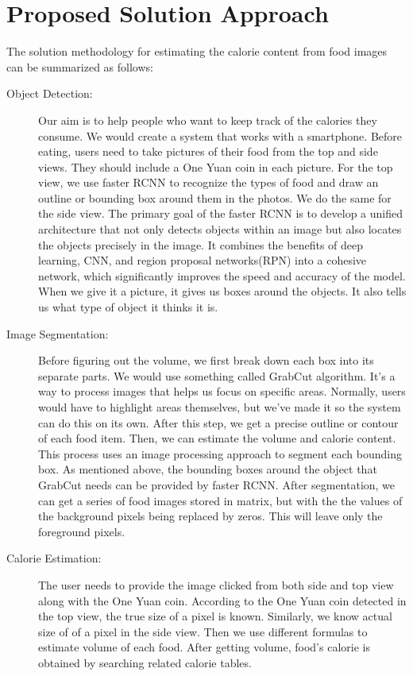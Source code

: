 \documentclass[12pt, a4paper, twoside]{article}
\begin{document}
\section{Proposed Solution Approach}
The solution methodology for estimating the calorie content from food images can be summarized as follows:
\begin{description}
	\item[Object Detection:] Our aim is to help people who want to keep track of the calories they consume. We would create a system that works with a smartphone. Before eating, users need to take pictures of their food from the top and side views. They should include a One Yuan coin in each picture. For the top view, we use faster RCNN to recognize the types of food and draw an outline or bounding box around them in the photos. We do the same for the side view. The primary goal of the faster RCNN is to develop a unified architecture that not only detects objects within an image but also locates the objects precisely in the image. It combines the benefits of deep learning, CNN, and region proposal networks(RPN) into a cohesive network, which significantly improves the speed and accuracy of the model. When we give it a picture, it gives us boxes around the objects. It also tells us what type of object it thinks it is.
	
	\item[Image Segmentation:] Before figuring out the volume, we first break down each box into its separate parts. We would use something called GrabCut algorithm. It's a way to process images that helps us focus on specific areas. Normally, users would have to highlight areas themselves, but we've made it so the system can do this on its own. After this step, we get a precise outline or contour of each food item. Then, we can estimate the volume and calorie content. This process uses an image processing approach to segment each bounding box. As mentioned above, the bounding boxes around the object that GrabCut needs can be provided by faster RCNN. After segmentation, we can get a series of food images stored in matrix, but with the the values of the background pixels being replaced by zeros. This will leave only the foreground pixels.
	
	\item[Calorie Estimation:] The user needs to provide the image clicked from both side and top view along with the One Yuan coin. According to the One Yuan coin detected in the top view, the true size of a pixel is known. Similarly, we know actual size of of a pixel in the side view. Then we use different formulas to estimate volume of each food. After getting volume, food’s calorie is obtained by searching related calorie tables. 
\end{description}
\end{document}
